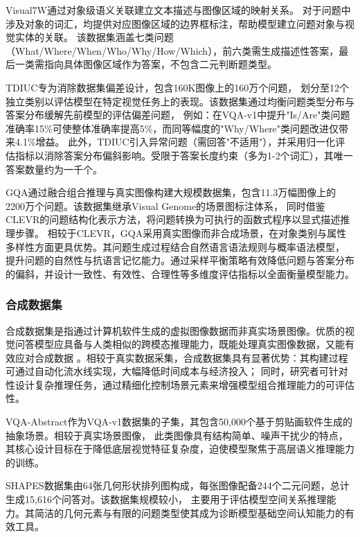 Visual7W\cite{zhu2016visual7w}通过对象级语义关联建立文本描述与图像区域的映射关系。
对于问题中涉及对象的词汇，均提供对应图像区域的边界框标注，帮助模型建立问题对象与视觉实体的关联。
该数据集涵盖七类问题（What/Where/When/Who/Why/How/Which），前六类需生成描述性答案，最后一类需指向具体图像区域作为答案，不包含二元判断题类型。

TDIUC\cite{kafle2017analysis}专为消除数据集偏差设计，包含160K图像上的160万个问题，
划分至12个独立类别以评估模型在特定视觉任务上的表现。该数据集通过均衡问题类型分布与答案分布缓解先前模型的评估偏差问题，
例如：在VQA-v1中提升"Is/Are"类问题准确率15\%可使整体准确率提高5\%，而同等幅度的"Why/Where"类问题改进仅带来4.1\%增益。
此外，TDIUC引入异常问题（需回答"不适用"），并采用归一化评估指标以消除答案分布偏斜影响。受限于答案长度约束（多为1-2个词汇），其唯一答案数量约为一千个。

GQA\cite{hudson2019gqa}通过融合组合推理与真实图像构建大规模数据集，包含11.3万幅图像上的2200万个问题。该数据集继承Visual Genome的场景图标注体系，
同时借鉴CLEVR\cite{johnson2017clevr}的问题结构化表示方法，将问题转换为可执行的函数式程序以显式描述推理步骤。
相较于CLEVR，GQA采用真实图像而非合成场景，在对象类别与属性多样性方面更具优势。其问题生成过程结合自然语言语法规则与概率语法模型，
提升问题的自然性与抗语言记忆能力。通过采样平衡策略有效降低问题与答案分布的偏斜，并设计一致性、有效性、合理性等多维度评估指标以全面衡量模型能力。
\subsubsection{合成数据集}
合成数据集是指通过计算机软件生成的虚拟图像数据而非真实场景图像。优质的视觉问答模型应具备与人类相似的跨模态推理能力，既能处理真实图像数据，又能有效应对合成数据
。相较于真实数据采集，合成数据集具有显著优势：其构建过程可通过自动化流水线实现，大幅降低时间成本与经济投入；
同时，研究者可针对性设计复杂推理任务，通过精细化控制场景元素来增强模型组合推理能力的可评估性。

VQA-Abstract作为VQA-v1数据集的子集，其包含50,000个基于剪贴画软件生成的抽象场景。相较于真实场景图像，
此类图像具有结构简单、噪声干扰少的特点，其核心设计目标在于降低底层视觉特征复杂度，迫使模型聚焦于高层语义推理能力的训练。

SHAPES\cite{andreas2016neural}数据集由64张几何形状排列图构成，每张图像配备244个二元问题，总计生成15,616个问答对。该数据集规模较小，
主要用于评估模型空间关系推理能力。其简洁的几何元素与有限的问题类型使其成为诊断模型基础空间认知能力的有效工具。

